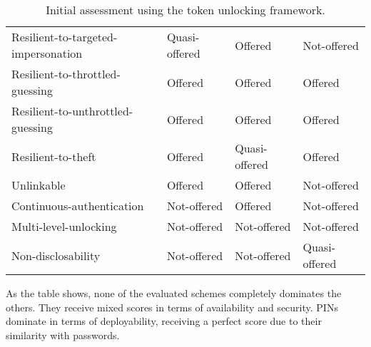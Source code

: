 \begin{table}
\begin{tabular}{l|l|l|l}
    Resilient-to-targeted-impersonation & \cellcolor{yellow!25}Quasi-offered & \cellcolor{green!25}Offered       & \cellcolor{red!25}Not-offered      \\
    Resilient-to-throttled-guessing     & \cellcolor{green!25}Offered       & \cellcolor{green!25}Offered       & \cellcolor{green!25}Offered          \\
    Resilient-to-unthrottled-guessing   & \cellcolor{green!25}Offered       & \cellcolor{green!25}Offered       & \cellcolor{green!25}Offered          \\
    Resilient-to-theft                  & \cellcolor{green!25}Offered       & \cellcolor{yellow!25}Quasi-offered   & \cellcolor{green!25}Offered          \\
    Unlinkable                          & \cellcolor{green!25}Offered       & \cellcolor{green!25}Offered       & \cellcolor{red!25}Not-offered      \\
    Continuous-authentication           & \cellcolor{red!25}Not-offered   & \cellcolor{green!25}Offered       & \cellcolor{red!25}Not-offered      \\
    Multi-level-unlocking               & \cellcolor{red!25}Not-offered   & \cellcolor{red!25}Not-offered   & \cellcolor{red!25}Not-offered      \\
    Non-disclosability                  & \cellcolor{red!25}Not-offered   & \cellcolor{red!25}Not-offered   & \cellcolor{yellow!25}Quasi-offered    \\
    \end{tabular}

	\caption{Initial assessment using the token unlocking framework.}
	\label{table:results}

\end{table}

As the table shows, none of the evaluated schemes completely dominates the others. They receive mixed scores in terms of availability and security. PINs dominate in terms of deployability, receiving a perfect score due to their similarity with passwords. 